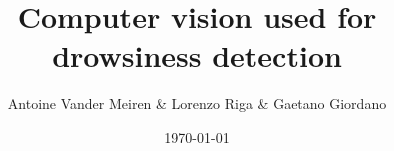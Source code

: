 \documentclass{beamer}
\title{Computer vision used for drowsiness detection}
\date{\today}
\author{Antoine Vander Meiren \& Lorenzo Riga \& Gaetano Giordano}
\institute{ECAM Brussels}
\begin{document}
\maketitle
\section{}
\end{document}
